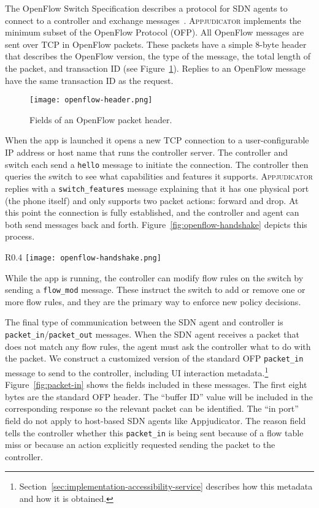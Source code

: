The OpenFlow Switch Specification describes a protocol for SDN agents to connect
to a controller and exchange messages~\cite{openflowspec}. \textsc{Appjudicator}
implements the minimum subset of the OpenFlow Protocol (OFP). All OpenFlow
messages are sent over TCP in OpenFlow packets. These packets have a simple
8-byte header that describes the OpenFlow version, the type of the message, the
total length of the packet, and transaction ID (see
Figure~\ref{fig:openflow-header}). Replies to an OpenFlow message have the same
transaction ID as the request.

\begin{figure}[h]
    \centering
    \texttt{[image: openflow-header.png]}
    \caption{Fields of an OpenFlow packet header.}
    \label{fig:openflow-header}
\end{figure}

When the app is launched it opens a new TCP connection to a user-configurable IP
address or host name that runs the controller server. The controller and switch
each send a \texttt{hello} message to initiate the connection. The controller
then queries the switch to see what capabilities and features it supports.
\textsc{Appjudicator} replies with a \texttt{switch\_features} message
explaining that it has one physical port (the phone itself) and only supports
two packet actions: forward and drop. At this point the connection is fully
established, and the controller and agent can both send messages back and forth.
Figure~\ref{fig:openflow-handshake} depicts this process.

\begin{wrapfigure}{R}{0.4\textwidth}
	\centering
	\texttt{[image: openflow-handshake.png]}
    \caption{OpenFlow handshake diagram.}
    \label{fig:openflow-handshake}
\end{wrapfigure}

While the app is running, the controller can modify flow rules on the
switch by sending a \texttt{flow\_mod} message. These instruct the switch
to add or remove one or more flow rules, and they are the primary way to enforce
new policy decisions.

The final type of communication between the SDN agent and controller is
\texttt{packet\_in}/\texttt{packet\_out} messages. When the SDN agent receives a
packet that does not match any flow rules, the agent must ask the controller
what to do with the packet. We construct a customized version of the standard
OFP \texttt{packet\_in} message to send to the controller, including UI
interaction metadata.\footnote{
	Section~\ref{sec:implementation-accessibility-service} describes how this
	metadata and how it is obtained.} Figure~\ref{fig:packet-in} shows the
fields included in these messages. The first eight bytes are the standard OFP
header. The ``buffer ID'' value will be included in the corresponding response
so the relevant packet can be identified.  The ``in port'' field do not apply to
host-based SDN agents like Appjudicator.  The reason field tells the controller
whether this \texttt{packet\_in} is being sent because of a flow table miss or
because an action explicitly requested sending the packet to the controller.

